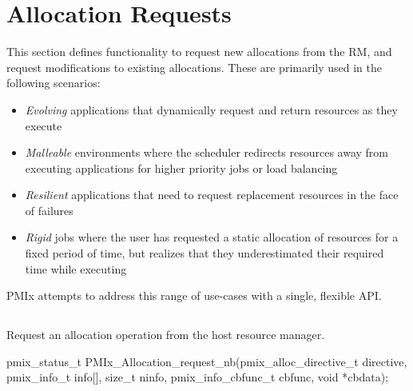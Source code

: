 \section{Allocation Requests}
\label{chap:api_job_mgmt:alloc}

This section defines functionality to request new allocations from the \ac{RM}, and request modifications to existing allocations.
These are primarily used in the following scenarios:
\begin{itemize}
\item \textit{Evolving} applications that dynamically request and return resources as they execute
\item \textit{Malleable} environments where the scheduler redirects resources away from executing applications for higher priority jobs or load balancing
\item \textit{Resilient} applications that need to request replacement resources in the face of failures
\item \textit{Rigid} jobs where the user has requested a static allocation of resources for a fixed period of time, but realizes that they underestimated their required time while executing
\end{itemize}
\ac{PMIx} attempts to address this range of use-cases with a single, flexible \ac{API}.

\subsection{}

\summary

Request an allocation operation from the host resource manager.

\format

\cspecificstart
\begin{codepar}
pmix_status_t
PMIx_Allocation_request_nb(pmix_alloc_directive_t directive,
                           pmix_info_t info[], size_t ninfo,
                           pmix_info_cbfunc_t cbfunc, void *cbdata);
\end{codepar}
\cspecificend

\begin{arglist}
\end{arglist}

